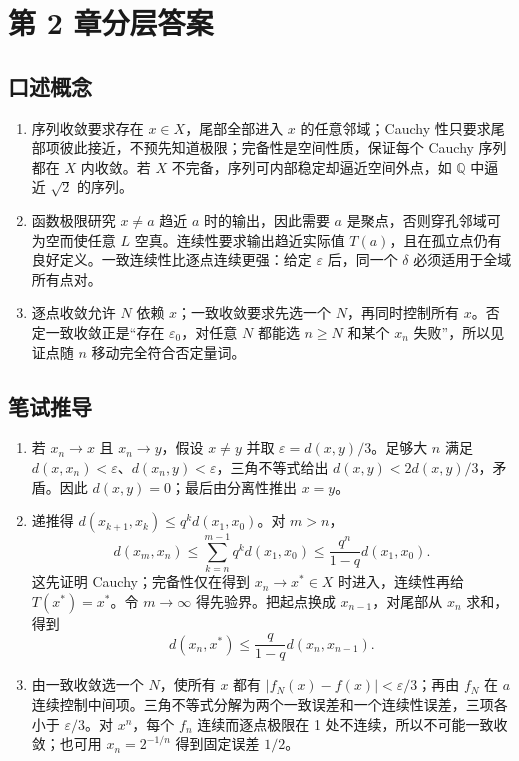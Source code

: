 \chapter{第 2 章分层答案}
\label{app:ch02-solutions}

\section*{口述概念}
\begin{enumerate}[leftmargin=*]
  \item 序列收敛要求存在 $x\in X$，尾部全部进入 $x$ 的任意邻域；Cauchy 性只要求尾部项彼此接近，不预先知道极限；完备性是空间性质，保证每个 Cauchy 序列都在 $X$ 内收敛。若 $X$ 不完备，序列可内部稳定却逼近空间外点，如 $\mathbb Q$ 中逼近 $\sqrt2$ 的序列。
  \item 函数极限研究 $x\ne a$ 趋近 $a$ 时的输出，因此需要 $a$ 是聚点，否则穿孔邻域可为空而使任意 $L$ 空真。连续性要求输出趋近实际值 $T(a)$，且在孤立点仍有良好定义。一致连续性比逐点连续更强：给定 $\varepsilon$ 后，同一个 $\delta$ 必须适用于全域所有点对。
  \item 逐点收敛允许 $N$ 依赖 $x$；一致收敛要求先选一个 $N$，再同时控制所有 $x$。否定一致收敛正是“存在 $\varepsilon_0$，对任意 $N$ 都能选 $n\geq N$ 和某个 $x_n$ 失败”，所以见证点随 $n$ 移动完全符合否定量词。
\end{enumerate}

\section*{笔试推导}
\begin{enumerate}[leftmargin=*]
  \item 若 $x_n\to x$ 且 $x_n\to y$，假设 $x\ne y$ 并取 $\varepsilon=d(x,y)/3$。足够大 $n$ 满足 $d(x,x_n)<\varepsilon$、$d(x_n,y)<\varepsilon$，三角不等式给出 $d(x,y)<2d(x,y)/3$，矛盾。因此 $d(x,y)=0$；最后由分离性推出 $x=y$。
  \item 递推得 $d(x_{k+1},x_k)\leq q^kd(x_1,x_0)$。对 $m>n$，
  \[
  d(x_m,x_n)\leq\sum_{k=n}^{m-1}q^kd(x_1,x_0)
  \leq\frac{q^n}{1-q}d(x_1,x_0).
  \]
  这先证明 Cauchy；完备性仅在得到 $x_n\to x^*\in X$ 时进入，连续性再给 $T(x^*)=x^*$。令 $m\to\infty$ 得先验界。把起点换成 $x_{n-1}$，对尾部从 $x_n$ 求和，得到
  \[
    d(x_n,x^*)\leq\frac{q}{1-q}d(x_n,x_{n-1}).
  \]
  \item 由一致收敛选一个 $N$，使所有 $x$ 都有 $|f_N(x)-f(x)|<\varepsilon/3$；再由 $f_N$ 在 $a$ 连续控制中间项。三角不等式分解为两个一致误差和一个连续性误差，三项各小于 $\varepsilon/3$。对 $x^n$，每个 $f_n$ 连续而逐点极限在 1 处不连续，所以不可能一致收敛；也可用 $x_n=2^{-1/n}$ 得到固定误差 $1/2$。
\end{enumerate}

